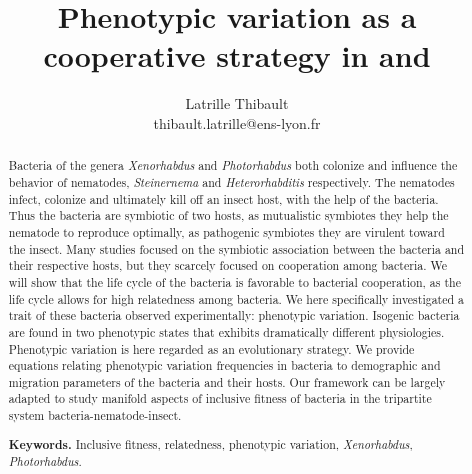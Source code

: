 \documentclass[10pt]{article}
\author{Latrille Thibault\\
\small thibault.latrille@ens-lyon.fr\\[-0.8ex]}
\title{Phenotypic variation as a cooperative strategy in \Xeno and \Photo}
\newcommand{\Xeno}{\textit{Xenorhabdus} }
\newcommand{\Stein}{\textit{Steinernema} }
\newcommand{\Photo}{\textit{Photorhabdus} }
\newcommand{\Hetero}{\textit{Heterorhabditis} }
\begin{document}
\begin{abstract}
Bacteria of the genera \Xeno and \Photo both colonize and influence the behavior of nematodes, \Stein and \Hetero respectively.
The nematodes infect, colonize and ultimately kill off an insect host, with the help of the bacteria.
Thus the bacteria are symbiotic of two hosts, as mutualistic symbiotes they help the nematode to reproduce optimally, as pathogenic symbiotes they are virulent toward the insect.
Many studies focused on the symbiotic association between the bacteria and their respective hosts, but they scarcely focused on cooperation among bacteria.
We will show that the life cycle of the bacteria is favorable to bacterial cooperation, as the life cycle allows for high relatedness among bacteria.
We here specifically investigated a trait of these bacteria observed experimentally: phenotypic variation. 
Isogenic bacteria are found in two phenotypic states that exhibits dramatically different physiologies. 
Phenotypic variation is here regarded as an evolutionary strategy.
We provide equations relating phenotypic variation frequencies in bacteria to demographic and migration parameters of the bacteria and their hosts. 
Our framework can be largely adapted to study manifold aspects of inclusive fitness of bacteria in the tripartite system bacteria-nematode-insect.

\smallskip
\noindent \textbf{Keywords.} Inclusive fitness, relatedness, phenotypic variation, \textit{Xenorhabdus}, \textit{Photorhabdus}.
\end{abstract}
\end{document}
